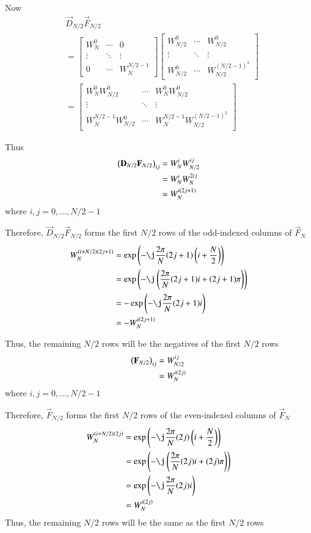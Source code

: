 \documentclass[journal,12pt,twocolumn]{IEEEtran}
\newcommand{\mymat}[1]{\ensuremath{\begin{bmatrix}#1\end{bmatrix}}}
\renewcommand\thesection{\arabic{section}}
\begin{document}
\begin{enumerate}[label=\thesection.\arabic*]
Now
\begin{align}
	&\vec{D}_{N/2}\vec{F}_{N/2} \\
	&= \mymat{W_N^0 & \cdots & 0 \\ \vdots & \ddots & \vdots \\ 0 & \cdots & W_N^{N/2-1}} \mymat{W_{N/2}^0 & \cdots & W_{N/2}^0 \\ \vdots & \ddots & \vdots \\ W_{N/2}^0 & \cdots & W_{N/2}^{(N/2 - 1)^2}} \\
	&= \mymat{W_N^0 W_{N/2}^0 & \cdots & W_N^0 W_{N/2}^0 \\ \vdots & \ddots & \vdots \\ W_N^{N/2-1} W_{N/2}^0 & \cdots & W_N^{N/2-1} W_{N/2}^{(N/2 - 1)^2}} 
\end{align}

Thus
\begin{align}
	\left(\mathbf{D}_{N/2}\mathbf{F}_{N/2}\right)_{ij} &= W_N^i W_{N/2}^{ij} \\
	&= W_N^i W_N^{2ij} \\
	&= W_N^{i(2j + 1)}
\end{align}
where $i, j = 0, \ldots, N/2 - 1$

Therefore, $\vec{D}_{N/2}\vec{F}_{N/2}$ forms the first $N/2$ rows of the odd-indexed columns of $\vec{F}_N$
\begin{align}
	W_N^{(i + N/2)(2j + 1)} &= \exp\brak{-\j \frac{2\pi}{N} (2j + 1)\brak{i + \frac{N}{2}}} \\
	&= \exp\brak{-\j \brak{\frac{2\pi}{N} (2j + 1)i + (2j + 1)\pi}} \\
	&= -\exp\brak{-\j \frac{2\pi}{N} (2j + 1)i} \\
	&= -W_N^{i(2j + 1)}
\end{align}

Thus, the remaining $N/2$ rows will be the negatives of the first $N/2$ rows
\begin{align}
	\left(\mathbf{F}_{N/2}\right)_{ij} &= W_{N/2}^{ij} \\
	&= W_N^{i(2j)}
\end{align}
where $i, j = 0, \ldots, N/2 - 1$

Therefore, $\vec{F}_{N/2}$ forms the first $N/2$ rows of the even-indexed columns of $\vec{F}_N$
\begin{align}
	W_N^{(i + N/2)(2j)} &= \exp\brak{-\j \frac{2\pi}{N} (2j)\brak{i + \frac{N}{2}}} \\
	&= \exp\brak{-\j \brak{\frac{2\pi}{N} (2j)i + (2j)\pi}} \\
	&= \exp\brak{-\j \frac{2\pi}{N} (2j)i} \\
	&= W_N^{i(2j)}
\end{align}
Thus, the remaining $N/2$ rows will be the same as the first $N/2$ rows


\end{enumerate}
\end{document}
